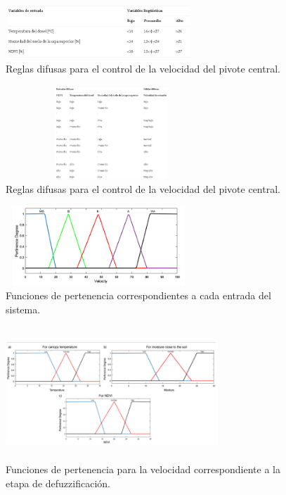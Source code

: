 \documentclass[10pt,conference]{IEEEtran}
\begin{document}
\begin{enumerate}
    \begin{figure}[H]
    \begin{center}
    \includegraphics[width=7cm,height=2cm]{figuras/RR2.PNG}
    \caption{Reglas difusas para el control de la velocidad del pivote central.}
    \label{RR2} 
    \end{center}
    \end{figure}
    
    \begin{figure}[H]
    \begin{center}
    \includegraphics[width=8cm,height=3.5cm]{figuras/RR22.PNG}
    \caption{Reglas difusas para el control de la velocidad del pivote central.}
    \label{RR22} 
    \end{center}
    \end{figure}
    
    \begin{figure}[H]
    \begin{center}
    \includegraphics[width=7cm,height=3cm]{figuras/RR3.PNG}
    \caption{Funciones de pertenencia correspondientes a cada entrada del sistema.}
    \label{RR3} 
    \end{center}
    \end{figure}
    
    \begin{figure}[H]
    \begin{center}
    \includegraphics[width=8cm,height=5cm]{figuras/RR33.PNG}
    \caption{Funciones de pertenencia para la velocidad correspondiente a la etapa de defuzzificación.}
    \label{RR33} 
    \end{center}
    \end{figure}
    

\end{enumerate}
\end{document}
